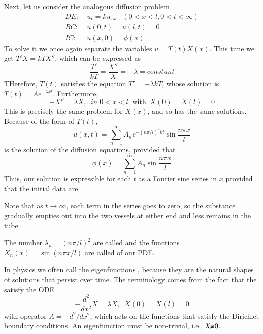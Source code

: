 Next, let us consider the analogous diffusion problem \begin{align}
    DE:&\;u_t = ku_{xx} \;\;\;(0 < x < l, 0 < t < \infty) \\
    BC:&\;u(0,t) = u(l,t) = 0 \\
    IC:&\;u(x,0) = \phi(x)
\end{align}
To solve it we once again separate the variables $u = T(t)X(x)$. This time we get $T'X = kTX''$, which can be expressed as \begin{equation*}
    \frac{T'}{kT} = \frac{X''}{X} = -\lambda = constant
\end{equation*}
THerefore, $T(t)$ satisfies the equation $T' = -\lambda kT$, whose solution is $T(t) = Ae^{-\lambda kt}$. Furthermore, \begin{equation*}
    -X'' = \lambda X,\;\;in\;0 < x < l\;\;\text{with}\;\;X(0) = X(l) = 0
\end{equation*}
This is precisely the same problem for $X(x)$, and so has the same solutions. Because of the form of $T(t)$, \begin{equation}
    \boxed{u(x,t) = \sum_{n=1}^{\infty}A_ne^{-(n\pi/l)^2kt}\sin\frac{n\pi x}{l}}
\end{equation}
is the solution of the diffusion equations, provided that \begin{equation}
    \phi(x) = \sum_{n=1}^{\infty}A_n\sin\frac{n\pi x}{l}
\end{equation}
Thus, our solution is expressible for each $t$ as a Fourier sine series in $x$ provided that the initial data are.

Note that as $t\rightarrow \infty$, each term in the series goes to zero, so the substance gradually empties out into the two vessels at either end and less remains in the tube.

\begin{definition}
    The number $\lambda_n = (n\pi/l)^2$ are called  and the functions $X_n(x) = \sin(n\pi x/l)$ are called  of our PDE.
\end{definition}
In physics we often call the eigenfunctions , because they are the natural shapes of solutions that persist over time. The terminology comes from the fact that the satisfy the ODE \begin{equation*}
    -\frac{d^2}{dx^2}X = \lambda X,\;\;X(0) = X(l) = 0
\end{equation*}
with operator $A = -d^2/dx^2$, which acts on the functions that satisfy the Dirichlet boundary conditions. An eigenfunction must be non-trivial, i.e., $X\cancel{\equiv} 0$.


